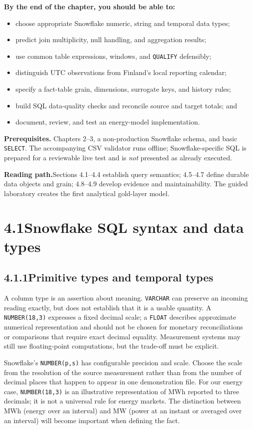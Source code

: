 \documentclass[11pt,twoside]{article}
\newcommand{\topic}[2]{\subsection*{#1\quad #2}}
\begin{document}
\textbf{By the end of the chapter, you should be able to:}
\begin{itemize}
\item choose appropriate Snowflake numeric, string and temporal data types;
\item predict join multiplicity, null handling, and aggregation results;
\item use common table expressions, windows, and \texttt{QUALIFY} defensibly;
\item distinguish UTC observations from Finland's local reporting calendar;
\item specify a fact-table grain, dimensions, surrogate keys, and history rules;
\item build SQL data-quality checks and reconcile source and target totals; and
\item document, review, and test an energy-model implementation.
\end{itemize}
\textbf{Prerequisites.} Chapters 2--3, a non-production Snowflake schema, and basic \texttt{SELECT}. The accompanying CSV validator runs offline; Snowflake-specific SQL is prepared for a reviewable live test and is \emph{not} presented as already executed.

\begin{whitebox}\textbf{Reading path.}\quad Sections 4.1--4.4 establish query semantics; 4.5--4.7 define durable data objects and grain; 4.8--4.9 develop evidence and maintainability. The guided laboratory creates the first analytical gold-layer model.\end{whitebox}

\newpage
\section*{4.1\quad Snowflake SQL syntax and data types}
\topic{4.1.1}{Primitive types and temporal types}
A column type is an assertion about meaning. \texttt{VARCHAR} can preserve an incoming reading exactly, but does not establish that it is a usable quantity. A \texttt{NUMBER(18,3)} expresses a fixed decimal scale; a \texttt{FLOAT} describes approximate numerical representation and should not be chosen for monetary reconciliations or comparisons that require exact decimal equality. Measurement systems may still use floating-point computations, but the trade-off must be explicit.

Snowflake's \texttt{NUMBER(p,s)} has configurable precision and scale. Choose the scale from the resolution of the source measurement rather than from the number of decimal places that happen to appear in one demonstration file. For our energy case, \texttt{NUMBER(18,3)} is an illustrative representation of MWh reported to three decimals; it is not a universal rule for energy markets. The distinction between MWh (energy over an interval) and MW (power at an instant or averaged over an interval) will become important when defining the fact.
\end{document}
